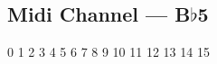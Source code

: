 \subsection[Midi Channel]{Midi Channel --- \UiKey{\SET}B$\flat$5}









































0
1
2
3
4
5
6
7
8
9
10
11
12
13
14
15

